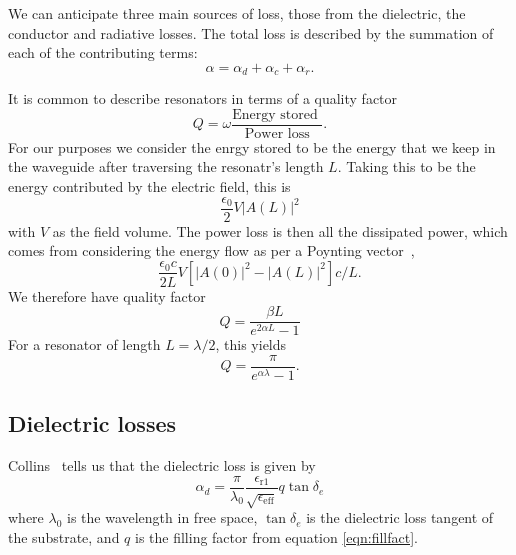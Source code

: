 \documentclass[a4paper]{article}
\begin{document}
We can anticipate three main sources of loss, those from the dielectric, the
conductor and radiative losses. \cite{Simons2004} The total loss is described
by the summation of each of the contributing terms:
\begin{equation}
  \alpha = \alpha_d + \alpha_c + \alpha_r.
\end{equation}

It is common to describe resonators in terms of a quality
factor~\cite{1125652}
\begin{equation}
  Q = \omega \frac{\text{Energy stored }}{\text{Power loss}}.
\end{equation}
For our purposes we consider the enrgy stored to be the energy that we keep in
the waveguide after traversing the resonatr's length $L$. Taking this to be the
energy contributed by the electric field, this is
\begin{equation}
  \frac{\epsilon_0}{2} V \lvert A(L) \rvert^2
\end{equation}
with $V$ as the field volume.  The power loss is then all the dissipated power,
which comes from considering the energy flow as per a Poynting
vector~\cite{Jackson1975},
\begin{equation}
  \frac{\epsilon_0 c}{2L}V \left[ \lvert A(0) \rvert^2 - \lvert A(L) \rvert^2
  \right] c/L.
\end{equation}
We therefore have quality factor
\begin{equation}
  Q = \frac{\beta L}{e^{2\alpha L} -1}
\end{equation}
For a resonator of length $L = \lambda/2$, this yields
\begin{equation}
  Q = \frac{\pi}{e^{\alpha \lambda} - 1}.
\end{equation}

\subsection{Dielectric losses}

Collins~\cite{Collin2007} tells us that the dielectric loss is given by
\begin{equation}
  \alpha_d =
  \frac{\pi}{\lambda_0}\frac{\epsilon_\mathrm{r1}}{\sqrt{\epsilon_\mathrm{eff}}}
  q \tan \delta_e
\end{equation}
where $\lambda_0$ is the wavelength in free space, $\tan \delta_e$ is the
dielectric loss tangent of the substrate, and $q$ is the filling factor from
equation \ref{eqn:fillfact}.
\end{document}
